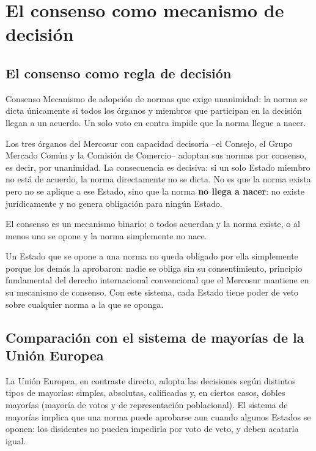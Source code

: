 \documentclass[12pt,oneside]{book}
\renewcommand{\chaptermark}[1]{\markboth{\thechapter.\ #1}{}}
\begin{document}
\chapter{El consenso como mecanismo de decisión}
\chaptermark{El consenso como mecanismo de decisión}
\label{cap:consenso}

\section{El consenso como regla de decisión}

\begin{definicion}{Consenso}
Mecanismo de adopción de normas que exige unanimidad: la norma se dicta únicamente si todos los órganos y miembros que participan en la decisión llegan a un acuerdo. Un solo voto en contra impide que la norma llegue a nacer.
\end{definicion}

Los tres órganos del Mercosur con capacidad decisoria --el Consejo, el Grupo Mercado Común y la Comisión de Comercio-- adoptan sus normas por consenso, es decir, por unanimidad. La consecuencia es decisiva: si un solo Estado miembro no está de acuerdo, la norma directamente no se dicta. No es que la norma exista pero no se aplique a ese Estado, sino que la norma \textbf{no llega a nacer}: no existe jurídicamente y no genera obligación para ningún Estado.

\begin{importante}
El consenso es un mecanismo binario: o todos acuerdan y la norma existe, o al menos uno se opone y la norma simplemente no nace.
\end{importante}

Un Estado que se opone a una norma no queda obligado por ella simplemente porque los demás la aprobaron: nadie se obliga sin su consentimiento, principio fundamental del derecho internacional convencional que el Mercosur mantiene en su mecanismo de consenso. Con este sistema, cada Estado tiene poder de veto sobre cualquier norma a la que se oponga.

\section{Comparación con el sistema de mayorías de la Unión Europea}

La Unión Europea, en contraste directo, adopta las decisiones según distintos tipos de mayorías: simples, absolutas, calificadas y, en ciertos casos, dobles mayorías (mayoría de votos y de representación poblacional). El sistema de mayorías implica que una norma puede aprobarse aun cuando algunos Estados se oponen: los disidentes no pueden impedirla por voto de veto, y deben acatarla igual.
\end{document}
